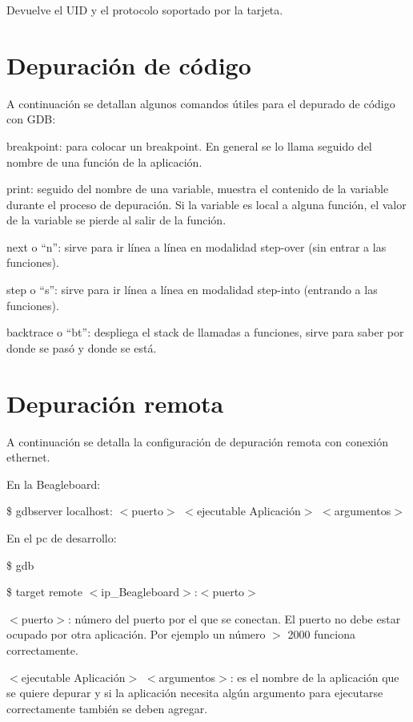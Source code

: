 Devuelve el UID y el protocolo soportado por la tarjeta.


\section{Depuración de código}\label{depurar}

A continuación se detallan algunos comandos útiles para el depurado de código con GDB:

breakpoint: para colocar un breakpoint. En general se lo llama seguido del nombre de una función de la aplicación.

print: seguido del nombre de una variable, muestra el contenido de la variable durante el proceso de depuración. Si la variable es local a alguna función, el valor de la variable se pierde al salir de la función.

next o “n”: sirve para ir línea a línea en modalidad step-over (sin entrar a las funciones).

step o “s”: sirve para ir línea a línea en modalidad step-into (entrando a las funciones).

backtrace o “bt”: despliega el stack de llamadas a funciones, sirve para saber por donde se pasó y donde se está.


\section{Depuración remota}\label{GDB}

A continuación se detalla la configuración de depuración remota con conexión ethernet.

\bigskip
En la Beagleboard:    

\bigskip                							
\centerline{\$ gdbserver localhost: $<$puerto$>$ $<$ejecutable Aplicación$>$ $<$argumentos$>$}

\bigskip
En el pc de desarrollo:

\bigskip
\centerline{\$ gdb}

\centerline{\$ target remote $<$ip\_Beagleboard$>$:$<$puerto$>$}

\bigskip
$<$puerto$>$: número del puerto por el que se conectan. El puerto no debe estar ocupado por otra aplicación. Por ejemplo un número $>$ 2000 funciona correctamente.

\bigskip
$<$ejecutable Aplicación$>$ $<$argumentos$>$: es el nombre de la aplicación que se quiere depurar y si la aplicación necesita algún argumento para ejecutarse correctamente también se deben agregar.

